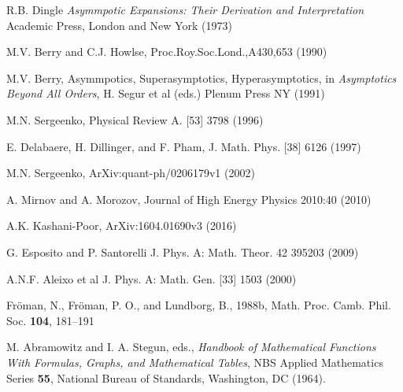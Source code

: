 \documentclass[atmp]{ipart_v1}
\begin{document}
\begin{thebibliography}{30}
 R.B. Dingle {\it Asymmpotic Expansions: Their Derivation and 
Interpretation} Academic Press, London and New York (1973)

 M.V. Berry and C.J. Howlse, Proc.Roy.Soc.Lond.,A430,653 (1990)

 M.V. Berry, Asymmpotics, Superasymptotics,
 Hyperasymptotics, in {\it Asymptotics Beyond All Orders}, H. Segur et al (eds.) Plenum Press NY (1991)

 M.N. Sergeenko, Physical Review A. [53] 3798 (1996)

 E. Delabaere, H. Dillinger, and F. Pham, J. Math. Phys. [38] 6126 (1997)

 M.N. Sergeenko, ArXiv:quant-ph/0206179v1 (2002)

 A. Mirnov and A. Morozov, Journal of High Energy Physics 2010:40 (2010)

 A.K. Kashani-Poor, ArXiv:1604.01690v3 (2016)

 G. Esposito and P. Santorelli J. Phys. A: Math. Theor. 42 395203 (2009)

 A.N.F. Aleixo et al J. Phys. A: Math. Gen. [33] 1503 (2000)

 Fr\"oman, N., Fr\"oman, P. O., and Lundborg, B., 1988b, 
Math. Proc. Camb. Phil. Soc. \textbf{104}, 181–191

 M. Abramowitz and I. A. Stegun, eds., 
{\it Handbook of Mathematical Functions With Formulas, Graphs, and Mathematical Tables}, 
NBS Applied Mathematics Series \textbf{55}, National Bureau of Standards, Washington, DC (1964).

\end{thebibliography}
\end{document}
